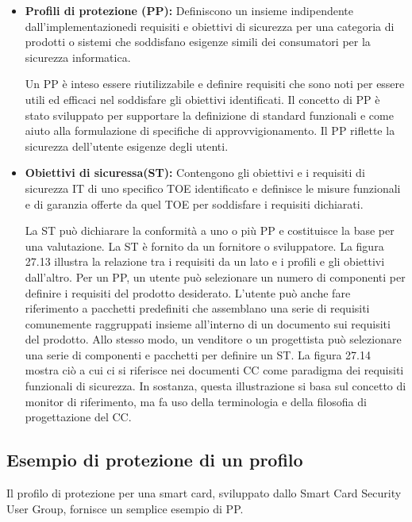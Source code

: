 \begin{itemize}
    \item \textbf{Profili di protezione (PP):} Definiscono un insieme indipendente dall'implementazionedi requisiti e obiettivi di sicurezza per una categoria di prodotti o sistemi che soddisfano esigenze simili dei consumatori per la sicurezza informatica.
    
    Un PP è inteso essere riutilizzabile e definire requisiti che sono noti per essere utili ed efficaci nel soddisfare gli obiettivi identificati. Il concetto di PP è stato sviluppato per supportare la definizione di standard funzionali e come aiuto alla formulazione di specifiche di approvvigionamento. Il PP riflette la sicurezza dell'utente esigenze degli utenti.
    
    \item \textbf{Obiettivi di sicuressa(ST):} Contengono gli obiettivi e i requisiti di sicurezza IT di uno specifico TOE identificato e definisce le misure funzionali e di garanzia offerte da quel TOE per soddisfare i requisiti dichiarati. 
    
   La ST può dichiarare la conformità a uno o più PP e costituisce la base per una valutazione. La ST è fornito da un fornitore o sviluppatore. La figura 27.13 illustra la relazione tra i requisiti da un lato e i profili e gli obiettivi dall'altro. Per un PP, un utente può selezionare un numero di componenti per definire i requisiti del prodotto desiderato. L'utente può anche fare riferimento a pacchetti predefiniti che assemblano una serie di requisiti comunemente raggruppati insieme all'interno di un documento sui requisiti del prodotto. Allo stesso modo, un venditore o un progettista può selezionare una serie di componenti e pacchetti per definire un ST. La figura 27.14 mostra ciò a cui ci si riferisce nei documenti CC come paradigma dei requisiti funzionali di sicurezza. In sostanza, questa illustrazione si basa sul concetto di monitor di riferimento, ma fa uso della terminologia e della filosofia di progettazione del CC.
\end{itemize}
\newpage
\subsection{Esempio di protezione di un profilo}
Il profilo di protezione per una smart card, sviluppato dallo Smart Card Security User Group, fornisce un semplice esempio di PP.

\singlespacing

